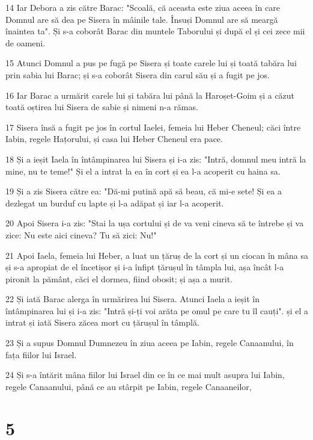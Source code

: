 \par 14 Iar Debora a zis către Barac: "Scoală, că aceasta este ziua aceea în care Domnul are să dea pe Sisera în mâinile tale. Însuși Domnul are să meargă înaintea ta". Și s-a coborât Barac din muntele Taborului și după el și cei zece mii de oameni.
\par 15 Atunci Domnul a pus pe fugă pe Sisera și toate carele lui și toată tabăra lui prin sabia lui Barac; și s-a coborât Sisera din carul său și a fugit pe jos.
\par 16 Iar Barac a urmărit carele lui și tabăra lui până la Haroșet-Goim și a căzut toată oștirea lui Sisera de sabie și nimeni n-a rămas.
\par 17 Sisera însă a fugit pe jos în cortul Iaelei, femeia lui Heber Cheneul; căci între Iabin, regele Hațorului, și casa lui Heber Cheneul era pace.
\par 18 Și a ieșit Iaela în întâmpinarea lui Sisera și i-a zis: "Intră, domnul meu intră la mine, nu te teme!" Și el a intrat la ea în cort și ea l-a acoperit cu haina sa.
\par 19 Și a zis Sisera către ea: "Dă-mi putină apă să beau, că mi-e sete! Și ea a dezlegat un burduf cu lapte și l-a adăpat și iar l-a acoperit.
\par 20 Apoi Sisera i-a zis: "Stai la ușa cortului și de va veni cineva să te întrebe și va zice: Nu este aici cineva? Tu să zici: Nu!"
\par 21 Apoi Iaela, femeia lui Heber, a luat un țăruș de la cort și un ciocan în mâna sa și s-a apropiat de el încetișor și i-a înfipt țărușul în tâmpla lui, așa încât l-a pironit la pământ, căci el dormea, fiind obosit; și așa a murit.
\par 22 Și iată Barac alerga în urmărirea lui Sisera. Atunci Iaela a ieșit în întâmpinarea lui și i-a zis: "Intră și-ți voi arăta pe omul pe care tu îl cauți". și el a intrat și iată Sisera zăcea mort cu țărușul în tâmplă.
\par 23 Și a supus Domnul Dumnezeu în ziua aceea pe Iabin, regele Canaanului, în fața fiilor lui Israel.
\par 24 Și s-a întărit mâna fiilor lui Israel din ce în ce mai mult asupra lui Iabin, regele Canaanului, până ce au stârpit pe Iabin, regele Canaaneilor,

\chapter{5}


